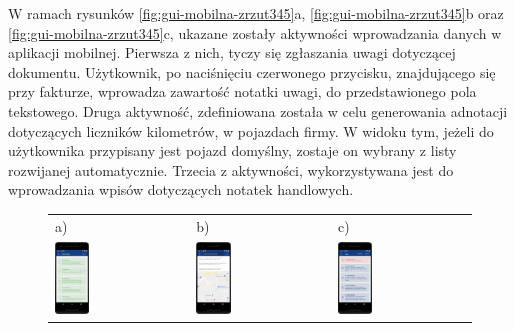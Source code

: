 W ramach rysunków \ref{fig:gui-mobilna-zrzut345}a, \ref{fig:gui-mobilna-zrzut345}b oraz \ref{fig:gui-mobilna-zrzut345}c, ukazane zostały aktywności wprowadzania danych w aplikacji mobilnej. Pierwsza z nich, tyczy się zgłaszania uwagi dotyczącej dokumentu. Użytkownik, po naciśnięciu czerwonego przycisku, znajdującego się przy fakturze, wprowadza zawartość notatki uwagi, do przedstawionego pola tekstowego. Druga aktywność, zdefiniowana została w celu generowania adnotacji dotyczących liczników kilometrów, w pojazdach firmy. W widoku tym, jeżeli do użytkownika przypisany jest pojazd domyślny, zostaje on wybrany z listy rozwijanej automatycznie. Trzecia z aktywności, wykorzystywana jest do wprowadzania wpisów dotyczących notatek handlowych. 

\begin{figure}[ht]
  \centering
	\begin{tabular}{l l l}
	a) & b) & c) \\
  \includegraphics[width=0.27\textwidth]{rys04/mobilna/zrzut6} & 
	\includegraphics[width=0.27\textwidth]{rys04/mobilna/zrzut8} &
	\includegraphics[width=0.27\textwidth]{rys04/mobilna/zrzut7}

\end{tabular}
\end{figure}
